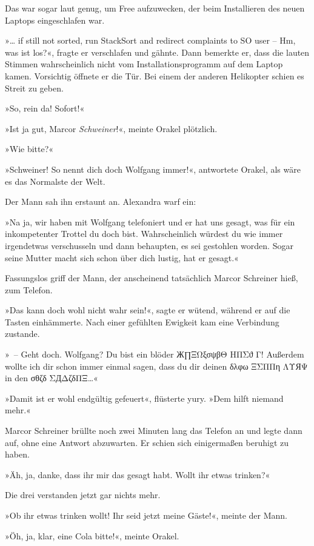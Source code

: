 Das war sogar laut genug, um Free aufzuwecken, der beim Installieren des neuen Laptops eingeschlafen war.

»… if still not sorted, run StackSort and redirect complaints to SO user -- Hm, was ist los?«, fragte er verschlafen und gähnte. Dann bemerkte er, dass die lauten Stimmen wahrscheinlich nicht vom Installationsprogramm auf dem Laptop kamen. Vorsichtig öffnete er die Tür. Bei einem der anderen Helikopter schien es Streit zu geben.

»So, rein da! Sofort!«

»Ist ja gut, Marcor \emph{Schweiner}!«, meinte Orakel plötzlich.

»Wie bitte?«

»Schweiner! So nennt dich doch Wolfgang immer!«, antwortete Orakel, als wäre es das Normalste der Welt.

Der Mann sah ihn erstaunt an. Alexandra warf ein:

»Na ja, wir haben mit Wolfgang telefoniert und er hat uns gesagt, was für ein inkompetenter Trottel du doch bist. Wahrscheinlich würdest du wie immer irgendetwas verschusseln und dann behaupten, es sei gestohlen worden. Sogar seine Mutter macht sich schon über dich lustig, hat er gesagt.«

Fassungslos griff der Mann, der anscheinend tatsächlich Marcor Schreiner hieß, zum Telefon.

»Das kann doch wohl nicht wahr sein!«, sagte er wütend, während er auf die Tasten einhämmerte. Nach einer gefühlten Ewigkeit kam eine Verbindung zustande.

»~– Geht doch. Wolfgang? Du bist ein blöder Ж∏ΞΩξσψβΘ ΗΠΣϑ Γ! Außerdem wollte ich dir schon immer einmal sagen, dass du dir deinen δλφω ΞΣΠΠη ΛΥЯΨ in den σθζδ ΣДΔζδΠΞ…«

»Damit ist er wohl endgültig gefeuert«, flüsterte yury. »Dem hilft niemand mehr.«

Marcor Schreiner brüllte noch zwei Minuten lang das Telefon an und legte dann auf, ohne eine Antwort abzuwarten. Er schien sich einigermaßen beruhigt zu haben.

»Äh, ja, danke, dass ihr mir das gesagt habt. Wollt ihr etwas trinken?«

Die drei verstanden jetzt gar nichts mehr.

»Ob ihr etwas trinken wollt! Ihr seid jetzt meine Gäste!«, meinte der Mann.

»Öh, ja, klar, eine Cola bitte!«, meinte Orakel.

